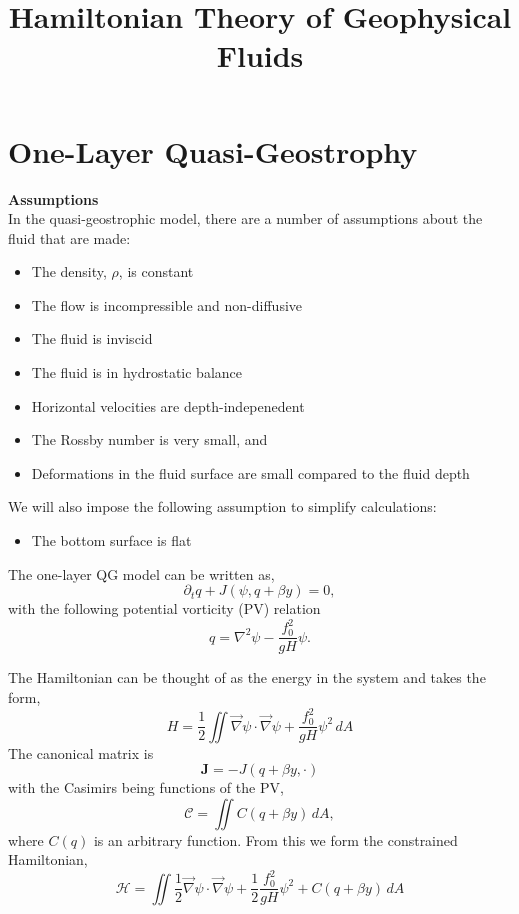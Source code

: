 \documentclass[12pt]{article}
\begin{document}
\title{Hamiltonian Theory of Geophysical Fluids}

\section{One-Layer Quasi-Geostrophy}{
    \textbf{Assumptions} \\
    In the quasi-geostrophic model, there are a number of assumptions about the fluid that are made:
    \begin{itemize}
        \item The density, $\rho$, is constant
        \item The flow is incompressible and non-diffusive
        \item The fluid is inviscid
        \item The fluid is in hydrostatic balance
        \item Horizontal velocities are depth-indepenedent
        \item The Rossby number is very small, and
        \item Deformations in the fluid surface are small compared to the fluid depth
    \end{itemize}
    We will also impose the following assumption to simplify calculations:
    \begin{itemize}
        \item The bottom surface is flat
    \end{itemize}

    The one-layer QG model can be written as,
    $$
    \partial_t q + J(\psi, q + \beta y) = 0,
    $$
    with the following potential vorticity (PV) relation
    $$
    q = \nabla^2 \psi - \frac{f_0^2}{gH} \psi.
    $$

    The Hamiltonian can be thought of as the energy in the system and takes the form,
    $$
    H =  \frac12 \iint \vec\nabla\psi \cdot \vec\nabla\psi + \frac{f_0^2}{g H} \psi^2 \, dA
    $$
    The canonical matrix is
    $$
    \mathbf{J} = -J(q + \beta y,\cdot)
    $$
    with the Casimirs being functions of the PV,
    $$
    \mathcal{C} = \iint C(q + \beta y) \, dA,
    $$
    where $C(q)$ is an arbitrary function. From this we form the constrained Hamiltonian,
    \begin{equation}
        \mathcal{H} = \iint  \frac12 \vec\nabla\psi \cdot \vec\nabla\psi + \frac12 \frac{f_0^2}{g H} \psi^2 + C(q + \beta y) \, dA
        \label{eqn:qg_ol_h}
    \end{equation}

}
\end{document}
